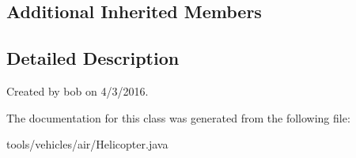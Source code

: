 \subsection*{Additional Inherited Members}


\subsection{Detailed Description}
Created by bob on 4/3/2016. 

The documentation for this class was generated from the following file\+:\begin{DoxyCompactItemize}
\item 
tools/vehicles/air/Helicopter.\+java\end{DoxyCompactItemize}
